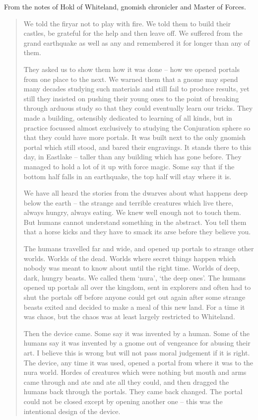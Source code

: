 \begin{multicols}{2}
\label{r_hunter}

From the notes of Hokl of Whiteland, gnomish chronicler and Master of Forces.

\begin{quotation}

	We told the firyar not to play with fire.
	We told them to build their castles, be grateful for the help and then leave off.
	We suffered from the grand earthquake as well as any and remembered it for longer than any of them.  

	They asked us to show them how it was done -- how we opened portals from one place to the next.
	We warned them that a gnome may spend many decades studying such materials and still fail to produce results, yet still they insisted on pushing their young ones to the point of breaking through arduous study so that they could eventually learn our tricks.
	They made a building, ostensibly dedicated to learning of all kinds, but in practice focussed almost exclusively to studying the Conjuration sphere so that they could have more portals.
	It was built next to the only gnomish portal which still stood, and bared their engravings.
	It stands there to this day, in Eastlake -- taller than any building which has gone before.
	They managed to hold a lot of it up with force magic.
	Some say that if the bottom half falls in an earthquake, the top half will stay where it is.

	We have all heard the stories from the dwarves about what happens deep below the earth -- the strange and terrible creatures which live there, always hungry, always eating.
	We knew well enough not to touch them.
	But humans cannot understand something in the abstract.
	You tell them that a horse kicks and they have to smack its arse before they believe you.

	The humans travelled far and wide, and opened up portals to strange other worlds.
	Worlds of the dead.
	Worlds where secret things happen which nobody was meant to know about until the right time.
	Worlds of deep, dark, hungry beasts.
	We called them `nura', `the deep ones'.
	The humans opened up portals all over the kingdom, sent in explorers and often had to shut the portals off before anyone could get out again after some strange beasts exited and decided to make a meal of this new land.
	For a time it was chaos, but the chaos was at least largely restricted to Whiteland.

	Then the device came.
	Some say it was invented by a human.
	Some of the humans say it was invented by a gnome out of vengeance for abusing their art.
	I believe this is wrong but will not pass moral judgement if it is right.
	The device, any time it was used, opened a portal from where it was to the nura world.
	Hordes of creatures which were nothing but mouth and arms came through and ate and ate all they could, and then dragged the humans back through the portals.
	They came back changed.
	The portal could not be closed except by opening another one -- this was the intentional design of the device.


\end{quotation}
\end{multicols}
